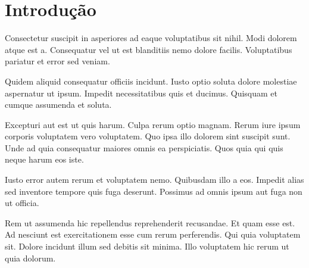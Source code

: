 
\section{Introdução}

Consectetur suscipit in asperiores ad eaque voluptatibus sit nihil. Modi dolorem atque est a. Consequatur vel ut est blanditiis nemo dolore facilis. Voluptatibus pariatur et error sed veniam.

Quidem aliquid consequatur officiis incidunt. Iusto optio soluta dolore molestiae aspernatur ut ipsum. Impedit necessitatibus quis et ducimus. Quisquam et cumque assumenda et soluta.

Excepturi aut est ut quis harum. Culpa rerum optio magnam. Rerum iure ipsum corporis voluptatem vero voluptatem. Quo ipsa illo dolorem sint suscipit sunt. Unde ad quia consequatur maiores omnis ea perspiciatis. Quos quia qui quis neque harum eos iste.

Iusto error autem rerum et voluptatem nemo. Quibusdam illo a eos. Impedit alias sed inventore tempore quis fuga deserunt. Possimus ad omnis ipsum aut fuga non ut officia.

Rem ut assumenda hic repellendus reprehenderit recusandae. Et quam esse est. Ad nesciunt est exercitationem esse cum rerum perferendis. Qui quia voluptatem sit. Dolore incidunt illum sed debitis sit minima. Illo voluptatem hic rerum ut quia dolorum.
